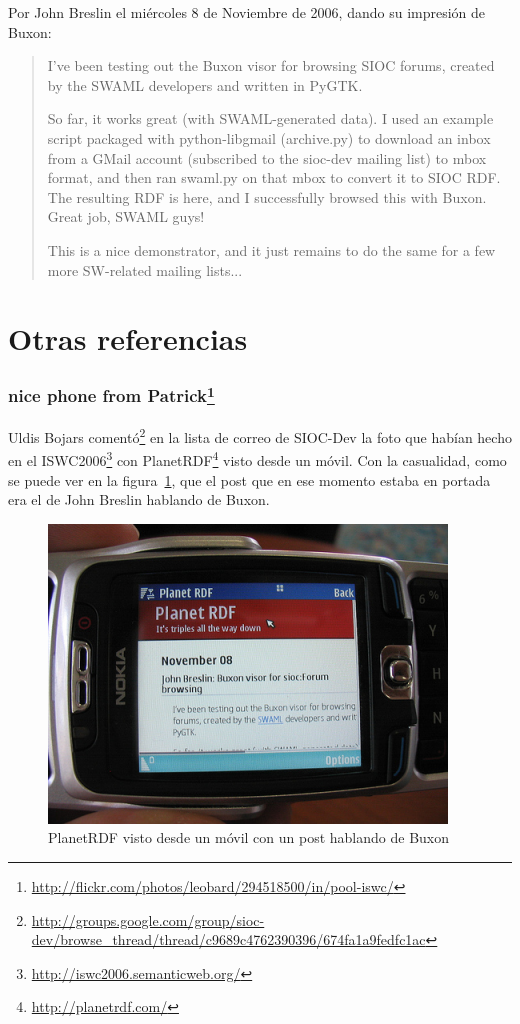 Por John Breslin el miércoles 8 de Noviembre de 2006, dando su impresión de Buxon:

\begin{quote}
 I've been testing out the Buxon visor for browsing SIOC forums, created by the SWAML 
 developers and written in PyGTK.

 So far, it works great (with SWAML-generated data). I used an example script packaged 
 with python-libgmail (archive.py) to download an inbox from a GMail account (subscribed 
 to the sioc-dev mailing list) to mbox format, and then ran swaml.py on that mbox to 
 convert it to SIOC RDF. The resulting RDF is here, and I successfully browsed this with 
 Buxon. Great job, SWAML guys!

 This is a nice demonstrator, and it just remains to do the same for a few more 
 SW-related mailing lists...
\end{quote}

\section{Otras referencias}

\subsubsection*{nice phone from Patrick\footnote{\url{http://flickr.com/photos/leobard/294518500/in/pool-iswc/}}}

Uldis Bojars comentó\footnote{\url{http://groups.google.com/group/sioc-dev/browse_thread/thread/c9689c4762390396/674fa1a9fedfc1ac}}
en la lista de correo de SIOC-Dev la foto que habían hecho en el
ISWC2006\footnote{\url{http://iswc2006.semanticweb.org/}} con 
PlanetRDF\footnote{\url{http://planetrdf.com/}} visto desde un móvil. Con la casualidad,
como se puede ver en la figura~\ref{fig:planetrdf-mobile}, que el post que en ese momento 
estaba en portada era el de John Breslin hablando de Buxon.

\begin{figure}[ht]
	\centering
	\includegraphics{images/screenshots/planetrdf-mobile.png}
	\caption{PlanetRDF visto desde un móvil con un post hablando de Buxon}
	\label{fig:planetrdf-mobile}
\end{figure}


